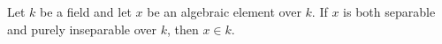 Let $k$ be a field and let $x$ be an algebraic element over $k$. If $x$ is both separable and purely inseparable over $k$, then $x \in k$.
